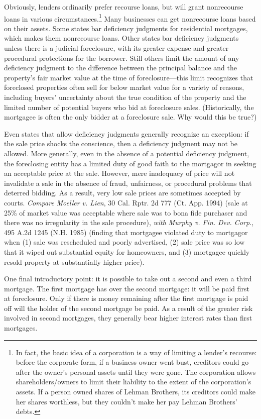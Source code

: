 Obviously, lenders ordinarily prefer recourse loans, but will grant nonrecourse
loans in various circumstances.\footnote{In fact, the basic idea of a
corporation is a way of limiting a lender's recourse: before the corporate
form, if a business owner went bust, creditors could go after the owner's
personal assets until they were gone.  The corporation allows
shareholders/owners to limit their liability to the extent of the corporation's
assets.  If a person owned shares of Lehman Brothers, its creditors could make
her shares worthless, but they couldn't make her pay Lehman Brothers' debts.} 
Many businesses can get nonrecourse loans based on their assets.  Some states
bar deficiency judgments for residential mortgages, which makes them
nonrecourse loans.  Other states bar deficiency judgments unless there is a
judicial foreclosure, with its greater expense and greater procedural
protections for the borrower.  Still others limit the amount of any deficiency
judgment to the difference between the principal balance and the property's
fair market value at the time of foreclosure---this limit recognizes that
foreclosed properties often sell for below market value for a variety of
reasons, including buyers' uncertainty about the true condition of the property
and the limited number of potential buyers who bid at foreclosure sales. 
(Historically, the mortgagee is often the only bidder at a foreclosure sale. 
Why would this be true?)

Even states that allow deficiency judgments generally recognize an exception: if
the sale price shocks the conscience, then a deficiency judgment may not be
allowed.  More generally, even in the absence of a potential deficiency
judgment, the foreclosing entity has a limited duty of good faith to the
mortgagor in seeking an acceptable price at the sale.  However, mere inadequacy
of price will not invalidate a sale in the absence of fraud, unfairness, or
procedural problems that deterred bidding.  As a result, very low sale prices
are sometimes accepted by courts.  \textit{Compare} \emph{Moeller v. Lien}, 30
Cal. Rptr. 2d 777 (Ct. App. 1994) (sale at 25\% of market value was acceptable
where sale was to bona fide purchaser and there was no irregularity in the sale
procedure), \textit{with} \emph{Murphy v. Fin. Dev. Corp.}, 495 A.2d 1245 (N.H.
1985) (finding that mortgagee violated duty to mortgagor when (1) sale was
rescheduled and poorly advertised, (2) sale price was so low that it wiped out
substantial equity for homeowners, and (3) mortgagee quickly resold property at
substantially higher price).

One final introductory point: it is possible to take out a second and even a
third mortgage.  The first mortgage has  over the second
mortgage:
it will be paid first at foreclosure.  Only if there is money remaining after
the first mortgage is paid off will the holder of the second mortgage be paid. 
As a result of the greater risk involved in second mortgages, they generally
bear higher interest rates than first mortgages.

